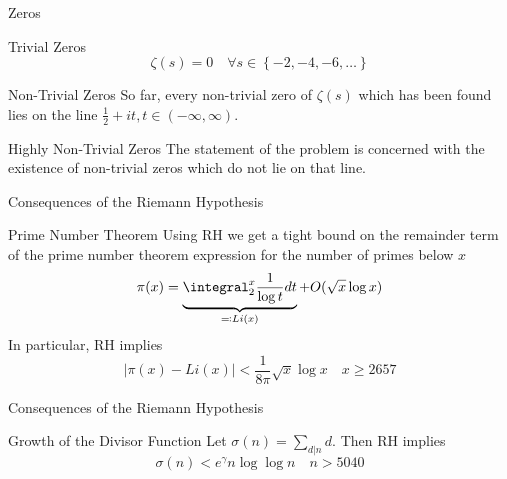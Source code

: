 \documentclass{beamer}
\begin{document}
  \begin{frame}{Zeros}
      \pause
      \begin{block}{Trivial Zeros}
          $$
          \zeta(s) = 0 \quad \forall s \in \left\{-2, -4, -6, \ldots \right\}
          $$
      \end{block}
      \pause
      \begin{block}{Non-Trivial Zeros}
          So far, every non-trivial zero of $\zeta(s)$ which has been found
          lies on the line $\frac{1}{2} + it, t \in (-\infty, \infty)$.
      \end{block}
      \pause
      \begin{block}{Highly Non-Trivial Zeros}
          The statement of the problem is concerned with the existence of
          non-trivial zeros which do not lie on that line.
      \end{block}
  \end{frame}
  \begin{frame}{Consequences of the Riemann Hypothesis}
      \pause
      \begin{block}{Prime Number Theorem}
          Using RH we get a tight bound on the remainder term of the prime
          number theorem expression for the number of primes below $x$
          $$
          \pi(x) = \underbrace{\integral_{2}^{x} \frac{1}{\log t}
          dt}_{\eqqcolon Li(x)} + O(\sqrt{x}\log x)
          $$\pause
          In particular, RH implies
          $$
          \left| \pi(x) - Li(x) \right| < \frac{1}{8\pi}\sqrt{x}\log x \quad
          x \ge 2657
          $$
      \end{block}
  \end{frame}
  \begin{frame}{Consequences of the Riemann Hypothesis}
      \pause
      \begin{block}{Growth of the Divisor Function}
          Let $\sigma(n) = \sum_{d | n}d$. Then RH implies
          $$
          \sigma(n) < e^{\gamma} n \log\log n \quad n > 5040
          $$
      \end{block}
  \end{frame}
\end{document}
